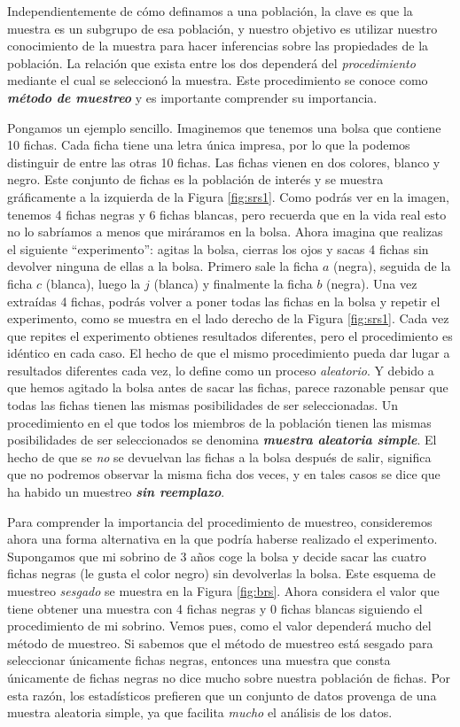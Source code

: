 \documentclass[spanish,]{book}
\begin{document}
Independientemente de cómo definamos a una población, la clave es que la
muestra es un subgrupo de esa población, y nuestro objetivo es utilizar
nuestro conocimiento de la muestra para hacer inferencias sobre las
propiedades de la población. La relación que exista entre los dos
dependerá del \emph{procedimiento} mediante el cual se seleccionó la
muestra. Este procedimiento se conoce como \textbf{\emph{método de
muestreo}} y es importante comprender su importancia.

Pongamos un ejemplo sencillo. Imaginemos que tenemos una bolsa que
contiene 10 fichas. Cada ficha tiene una letra única impresa, por lo que
la podemos distinguir de entre las otras 10 fichas. Las fichas vienen en
dos colores, blanco y negro. Este conjunto de fichas es la población de
interés y se muestra gráficamente a la izquierda de la Figura
\ref{fig:srs1}. Como podrás ver en la imagen, tenemos 4 fichas negras y
6 fichas blancas, pero recuerda que en la vida real esto no lo sabríamos
a menos que miráramos en la bolsa. Ahora imagina que realizas el
siguiente ``experimento'': agitas la bolsa, cierras los ojos y sacas 4
fichas sin devolver ninguna de ellas a la bolsa. Primero sale la ficha
\(a\) (negra), seguida de la ficha \(c\) (blanca), luego la \(j\)
(blanca) y finalmente la ficha \(b\) (negra). Una vez extraídas 4
fichas, podrás volver a poner todas las fichas en la bolsa y repetir el
experimento, como se muestra en el lado derecho de la Figura
\ref{fig:srs1}. Cada vez que repites el experimento obtienes resultados
diferentes, pero el procedimiento es idéntico en cada caso. El hecho de
que el mismo procedimiento pueda dar lugar a resultados diferentes cada
vez, lo define como un proceso \emph{aleatorio}. Y debido a que hemos
agitado la bolsa antes de sacar las fichas, parece razonable pensar que
todas las fichas tienen las mismas posibilidades de ser seleccionadas.
Un procedimiento en el que todos los miembros de la población tienen las
mismas posibilidades de ser seleccionados se denomina
\textbf{\emph{muestra aleatoria simple}}. El hecho de que se \emph{no}
se devuelvan las fichas a la bolsa después de salir, significa que no
podremos observar la misma ficha dos veces, y en tales casos se dice que
ha habido un muestreo \textbf{\emph{sin reemplazo}}.

Para comprender la importancia del procedimiento de muestreo,
consideremos ahora una forma alternativa en la que podría haberse
realizado el experimento. Supongamos que mi sobrino de 3 años coge la
bolsa y decide sacar las cuatro fichas negras (le gusta el color negro)
sin devolverlas la bolsa. Este esquema de muestreo \emph{sesgado} se
muestra en la Figura \ref{fig:brs}. Ahora considera el valor que tiene
obtener una muestra con 4 fichas negras y 0 fichas blancas siguiendo el
procedimiento de mi sobrino. Vemos pues, como el valor dependerá mucho
del método de muestreo. Si sabemos que el método de muestreo está
sesgado para seleccionar únicamente fichas negras, entonces una muestra
que consta únicamente de fichas negras no dice mucho sobre nuestra
población de fichas. Por esta razón, los estadísticos prefieren que un
conjunto de datos provenga de una muestra aleatoria simple, ya que
facilita \emph{mucho} el análisis de los datos.
\end{document}
